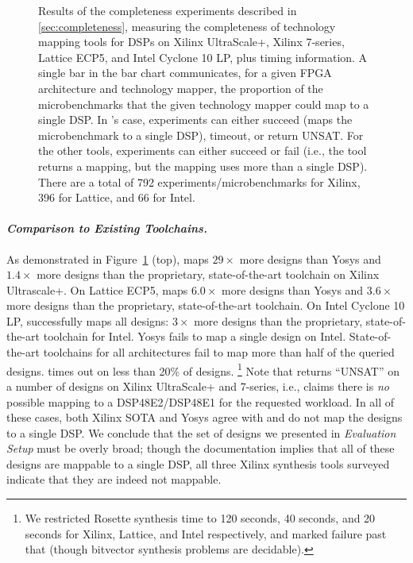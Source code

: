 \begin{figure}
    \caption{
Results of 
  the completeness experiments
  described in \cref{sec:completeness},
  measuring the completeness 
  of technology mapping tools for DSPs on Xilinx UltraScale+, Xilinx 7-series, Lattice ECP5, and Intel Cyclone 10 LP,
  plus timing information.
A single bar in the bar chart
  communicates,
  for a given FPGA architecture
  and technology mapper,
  the proportion of the microbenchmarks
  that the given technology mapper could map to a single DSP.
In \lr's case, experiments can 
  either succeed 
  (\lr maps the microbenchmark
    to a single DSP),
  timeout,
  or return UNSAT.
For the other tools,
  experiments can either
  succeed
  or fail
  (i.e., the tool returns a mapping,
    but the mapping uses more than
    a single DSP).
There are a total of 
  792 experiments/microbenchmarks for Xilinx,
  396 for Lattice,
  and 66 for Intel.
    }
    \label{fig:xilinx-completeness}
\end{figure}


\paragraph{\textnormal{\textit{\textbf{Comparison to Existing Toolchains.}}}}
As demonstrated in Figure~\ref{fig:xilinx-completeness} (top),
  \lr maps $29\times$ more
  designs than Yosys
  and $1.4\times$ more designs
  than the proprietary,
  state-of-the-art toolchain on Xilinx Ultrascale+.
On Lattice ECP5,
  \lr maps $6.0\times$ more
  designs than Yosys 
  and $3.6\times$ more designs
  than the proprietary,
  state-of-the-art toolchain.
On Intel Cyclone 10 LP,
  \lr successfully maps all designs:
  $3\times$ more designs
  than the proprietary,
  state-of-the-art toolchain for Intel.
Yosys fails to map a single design
  on Intel.
State-of-the-art toolchains
  for all architectures fail
  to map more than half
  of the queried designs.
\lr times out on 
less than 20\% of designs.%
\footnote{We restricted Rosette
synthesis time to 
120 seconds, 40 seconds, and 20 seconds for
Xilinx, Lattice, and Intel
respectively, and
marked failure past that (though bitvector synthesis problems
are decidable).}
Note that \lr
  returns ``UNSAT'' on 
  a number of
  designs on Xilinx UltraScale+ and 7-series, i.e., 
  \lr claims there is
  \textit{no} possible mapping
  to a DSP48E2/DSP48E1 for the
  requested workload.
In all of these cases,
  both Xilinx SOTA
  and Yosys
  agree with \lr 
  and do not map the designs
  to a single DSP.
We conclude that 
  the set of designs we presented in 
  \textit{Evaluation Setup}
  must be overly broad;
  though the documentation implies
  that all of these designs are mappable
  to a single DSP,
  all three Xilinx synthesis tools 
  surveyed indicate that they are
  indeed not mappable.

